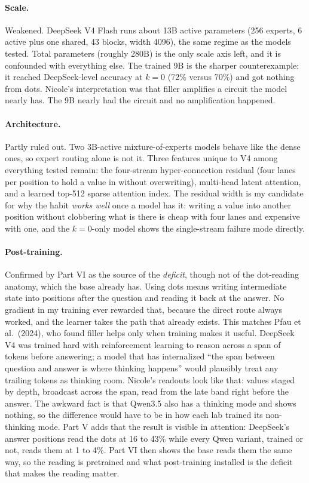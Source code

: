 \documentclass[11pt]{article}
\begin{document}
\paragraph{Scale.} Weakened. DeepSeek V4 Flash runs about 13B active parameters (256 experts, 6 active plus one shared, 43 blocks, width 4096), the same regime as the models tested. Total parameters (roughly 280B) is the only scale axis left, and it is confounded with everything else. The trained 9B is the sharper counterexample: it reached DeepSeek-level accuracy at $k=0$ (72\% versus 70\%) and got nothing from dots. Nicole's interpretation was that filler amplifies a circuit the model nearly has. The 9B nearly had the circuit and no amplification happened.

\paragraph{Architecture.} Partly ruled out. Two 3B-active mixture-of-experts models behave like the dense ones, so expert routing alone is not it. Three features unique to V4 among everything tested remain: the four-stream hyper-connection residual (four lanes per position to hold a value in without overwriting), multi-head latent attention, and a learned top-512 sparse attention index. The residual width is my candidate for why the habit \emph{works well} once a model has it: writing a value into another position without clobbering what is there is cheap with four lanes and expensive with one, and the $k=0$-only model shows the single-stream failure mode directly.

\paragraph{Post-training.} Confirmed by Part VI as the source of the \emph{deficit}, though not of the dot-reading anatomy, which the base already has. Using dots means writing intermediate state into positions after the question and reading it back at the answer. No gradient in my training ever rewarded that, because the direct route always worked, and the learner takes the path that already exists. This matches Pfau et al.\ (2024), who found filler helps only when training makes it useful. DeepSeek V4 was trained hard with reinforcement learning to reason across a span of tokens before answering; a model that has internalized ``the span between question and answer is where thinking happens'' would plausibly treat any trailing tokens as thinking room. Nicole's readouts look like that: values staged by depth, broadcast across the span, read from the late band right before the answer. The awkward fact is that Qwen3.5 also has a thinking mode and shows nothing, so the difference would have to be in how each lab trained its non-thinking mode. Part V adds that the result is visible in attention: DeepSeek's answer positions read the dots at 16 to 43\% while every Qwen variant, trained or not, reads them at 1 to 4\%. Part VI then shows the base reads them the same way, so the reading is pretrained and what post-training installed is the deficit that makes the reading matter.
\end{document}
